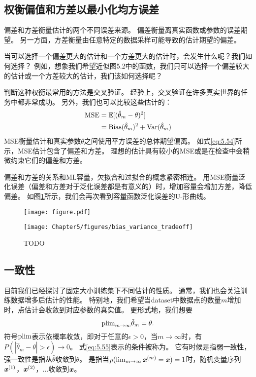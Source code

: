 
\subsection{权衡偏值和方差以最小化均方误差}
\label{sec:trading_off_bias_and_variance_to_minimize_mean_squared_error}
偏差和方差衡量估计的两个不同误差来源。
偏差衡量离真实函数或参数的误差期望。
另一方面，方差衡量由任意特定的数据采样可能导致的估计期望的偏差。

当可以选择一个偏差更大的估计和一个方差更大的估计时，会发生什么呢？我们如何选择？
例如，想象我们希望近似图5.2中的函数，我们只可以选择一个偏差较大的估计或一个方差较大的估计，我们该如何选择呢？

判断这种权衡最常用的方法是交叉验证。
经验上，交叉验证在许多真实世界的任务中都非常成功。
另外，我们也可以比较这些估计的：
\begin{align}
    \text{MSE} &= \mathbb{E}[ ( \hat{\theta}_m - \theta  )^2 ] \\
        &= \text{Bias}( \hat{\theta}_m )^2 + \text{Var}( \hat{\theta}_m ) \label{eq:5.54}
\end{align}
MSE衡量估计和真实参数$\theta$之间使用平方误差的总体期望偏离。
如式\ref{eq:5.54}所示，MSE估计包含了偏差和方差。
理想的估计具有较小的MSE或是在检查中会稍微约束它们的偏差和方差。

偏差和方差的关系和\gls{ML}容量，欠拟合和过拟合的概念紧密相连。
用MSE衡量泛化误差（偏差和方差对于泛化误差都是有意义的）时，增加容量会增加方差，降低偏差。
如图\ref{fig:chap5_bias_variance_tradeoff}所示，我们会再次看到容量函数泛化误差的U-形曲线。

\begin{figure}[!htb]
\ifOpenSource
\centerline{\texttt{[image: figure.pdf]}}
\else
\centerline{\texttt{[image: Chapter5/figures/bias\_variance\_tradeoff]}}
\fi
\caption{TODO}
\label{fig:chap5_bias_variance_tradeoff}
\end{figure}


\subsection{一致性}
\label{sec:consistency}
目前我们已经探讨了固定大小训练集下不同估计的性质。
通常，我们也会关注训练数据增多后估计的性能。
特别地，我们希望当\gls{dataset}中数据点的数量$m$增加时，点估计会收敛到对应参数的真实值。
更形式地，我们想要
\begin{equation}
\label{eq:5.55}
    \text{plim}_{m\to\infty} \hat{\theta}_m = \theta.
\end{equation}
符号$\text{plim}$表示依概率收敛，即对于任意的$\epsilon > 0$，当$m\to\infty$时，有$P(|\hat{\theta}_m - \theta| > \epsilon) \to 0$。
式\ref{eq:5.55}表示的条件被称为。
它有时候是指弱一致性，强一致性是指从$\hat{\theta}$收敛到$\theta$。
是指当$p(\lim_{m\to\infty} \boldsymbol{\mathit{x}}^{(m)} = \boldsymbol{\mathit{x}}) = 1 $时，随机变量序列$\boldsymbol{\mathit{x}}^{(1)}$，$\boldsymbol{\mathit{x}}^{(2)}$，$...$收敛到$\boldsymbol{\mathit{x}}$。

